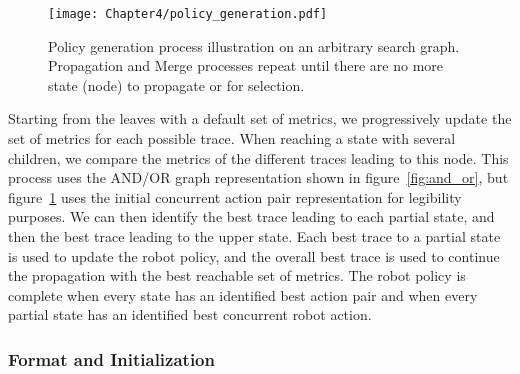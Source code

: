\begin{figure}[h]
    \texttt{[image: Chapter4/policy\_generation.pdf]}
    \caption{Policy generation process illustration on an arbitrary search graph. Propagation and Merge processes repeat until there are no more state (node) to propagate or for selection.}
    \label{fig:policy_generation}
\end{figure}

Starting from the leaves with a default set of metrics, we progressively update the set of metrics for each possible trace. When reaching a state with several children, we compare the metrics of the different traces leading to this node. 
This process uses the AND/OR graph representation shown in figure~\ref{fig:and_or}, but figure~\ref{fig:policy_generation} uses the initial concurrent action pair representation for legibility purposes. 
We can then identify the best trace leading to each partial state, and then the best trace leading to the upper state. Each best trace to a partial state is used to update the robot policy, and the overall best trace is used to continue the propagation with the best reachable set of metrics. The robot policy is complete when every state has an identified best action pair and when every partial state has an identified best concurrent robot action. 






    \subsubsection{Format and Initialization}

